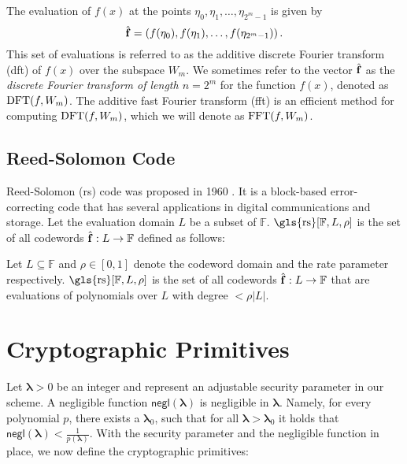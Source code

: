 \begin{definition}
	The evaluation of $f(x)$ at the points $\eta_0, \eta_1, \ldots, \eta_{2^m-1}$ is given by
	\begin{equation*}
		\hat{{\bf{f}}} = \left( f(\eta_0), f(\eta_1), \ldots, f(\eta_{2^m-1}) \right).
	\end{equation*}
	This set of evaluations is referred to as the additive discrete Fourier transform (\gls{dft}) of $f(x)$ over the subspace $W_m$. We sometimes refer to the vector $\hat{{\bf{f}}}$ as the \textit{discrete Fourier transform of length $n=2^m$} for the function $f(x)$, denoted as $\operatorname{DFT}(f, W_m)$. The additive fast Fourier transform (\gls{fft}) is an efficient method for computing $\operatorname{DFT}(f, W_m)$, which we will denote as $\operatorname{FFT}(f, W_m)$.
\end{definition}

\subsection{Reed-Solomon Code}

Reed-Solomon (\gls{rs}) code was proposed in 1960  \cite{rs-code}. It is a block-based error-correcting code that has several applications in digital communications and storage. Let the evaluation domain $L$  be a subset of $\mathbb{F}$. $\text{\gls{rs}}[\mathbb{F}, L, \rho]$ is the set of all codewords $\hat{{\bf{f}}}:L\rightarrow \mathbb{F}$ defined as follows: 


\begin{definition}\label{RScode} Let $L\subseteq\mathbb{F}$ and $\rho \in [0,1]$ denote the codeword domain and the rate parameter respectively. $\text{\gls{rs}}[\mathbb{F}, L, \rho]$ is the set of all codewords $\hat{{\bf{f}}}:L\rightarrow\mathbb{F}$ 
	that are evaluations of polynomials over \(L\) with degree \( < \rho|L| \).
\end{definition}


\section{Cryptographic Primitives}
\label{sec:prel_Cryptographic Primitives}

Let $\boldsymbol{\lambda} > 0$ be an integer and represent an adjustable security parameter in our scheme. A negligible function $\mathsf{negl}(\boldsymbol{\lambda})$ is  negligible in $\boldsymbol{\lambda}$. Namely, for every polynomial $p$, there exists a $\boldsymbol{\lambda}_0$, such that for   all $\boldsymbol{\lambda} > \boldsymbol{\lambda}_0$ it holds that $\mathsf{negl}(\boldsymbol{\lambda})<\frac{1}{p(\boldsymbol{\lambda})}$. With the security parameter and the negligible function in place, we now define the cryptographic primitives:

